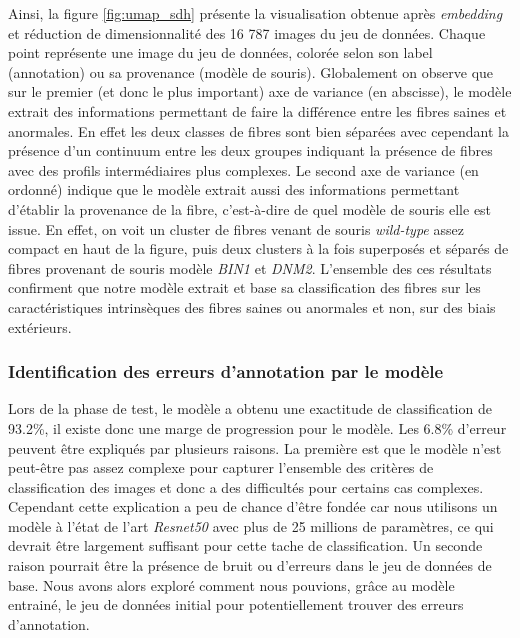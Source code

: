 Ainsi, la figure \ref{fig:umap_sdh} présente la visualisation obtenue après \textit{embedding} et réduction de dimensionnalité des 16 787 images du jeu de données. Chaque point représente une image du jeu de données, colorée selon son label (annotation) ou sa provenance (modèle de souris). Globalement on observe que sur le premier (et donc le plus important) axe de variance (en abscisse), le modèle extrait des informations permettant de faire la différence entre les fibres saines et anormales. En effet les deux classes de fibres sont bien séparées avec cependant la présence d'un continuum entre les deux groupes indiquant la présence de fibres avec des profils intermédiaires plus complexes. Le second axe de variance (en ordonné) indique que le modèle extrait aussi des informations permettant d'établir la provenance de la fibre, c'est-à-dire de quel modèle de souris elle est issue. En effet, on voit un cluster de fibres venant de souris \textit{wild-type} assez compact en haut de la figure, puis deux clusters à la fois superposés et séparés de fibres provenant de souris modèle \textit{BIN1} et \textit{DNM2}. L'ensemble des ces résultats confirment que notre modèle extrait et base sa classification des fibres sur les caractéristiques intrinsèques des fibres saines ou anormales et non, sur des biais extérieurs.

\subsubsection{Identification des erreurs d'annotation par le modèle}
Lors de la phase de test, le modèle a obtenu une exactitude de classification de 93.2\%, il existe donc une marge de progression pour le modèle. Les 6.8\% d'erreur peuvent être expliqués par plusieurs raisons. La première est que le modèle n'est peut-être pas assez complexe pour capturer l'ensemble des critères de classification des images et donc a des difficultés pour certains cas complexes. Cependant cette explication a peu de chance d'être fondée car nous utilisons un modèle à l'état de l'art \textit{Resnet50} avec plus de 25 millions de paramètres, ce qui devrait être largement suffisant pour cette tache de classification. Un seconde raison pourrait être la présence de bruit ou d'erreurs dans le jeu de données de base. Nous avons alors exploré comment nous pouvions, grâce au modèle entrainé, le jeu de données initial pour potentiellement trouver des erreurs d'annotation.

